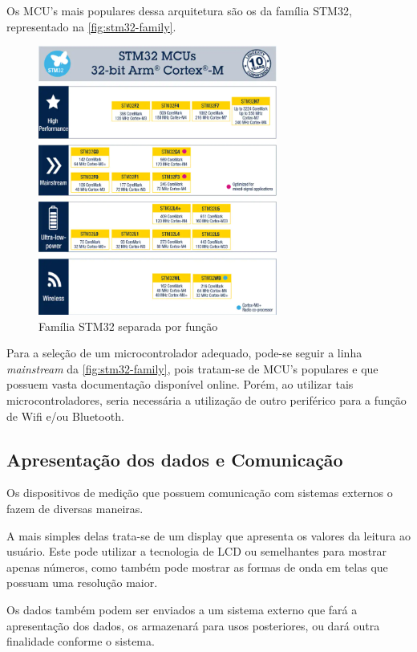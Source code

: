 Os \gls{MCU}'s mais populares dessa arquitetura são os da família STM32, representado na \autoref{fig:stm32-family}.

\begin{figure}[htb!]
    \caption{Família STM32 separada por função}
    \label{fig:stm32-family}
    \includegraphics[width=0.7\textwidth]{figuras/STM32-family.png}
\end{figure}

Para a seleção de um microcontrolador adequado, pode-se seguir a linha \textit{mainstream} da \autoref{fig:stm32-family}, pois tratam-se de \gls{MCU}'s populares e que possuem vasta documentação disponível online. Porém, ao utilizar tais microcontroladores, seria necessária a utilização de outro periférico para a função de Wifi e/ou Bluetooth.

\subsection{Apresentação dos dados e Comunicação}\label{sec:Interface}

Os dispositivos de medição que possuem comunicação com sistemas externos o fazem de diversas maneiras. 

A mais simples delas trata-se de um display que apresenta os valores da leitura ao usuário. Este pode utilizar a tecnologia de \gls{LCD} ou semelhantes para mostrar apenas números, como também pode mostrar as formas de onda em telas que possuam uma resolução maior.

Os dados também podem ser enviados a um sistema externo que fará a apresentação dos dados, os armazenará para usos posteriores, ou dará outra finalidade conforme o sistema.

